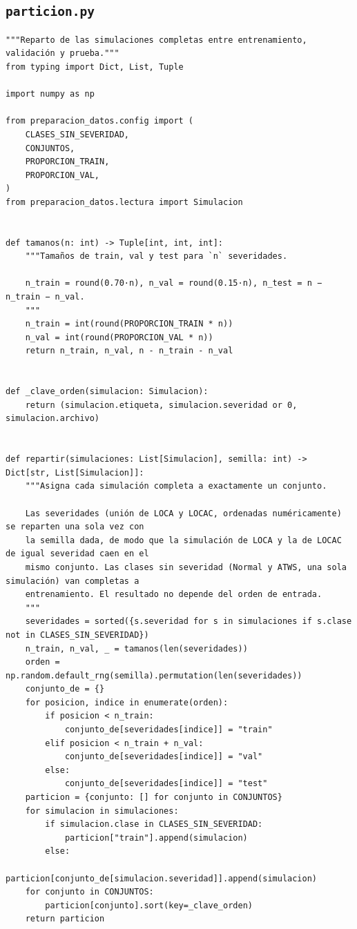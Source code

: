 \documentclass[12pt,a4paper]{article}
\begin{document}
\subsection*{\texttt{particion.py}}
\begin{lstlisting}
"""Reparto de las simulaciones completas entre entrenamiento, validación y prueba."""
from typing import Dict, List, Tuple

import numpy as np

from preparacion_datos.config import (
    CLASES_SIN_SEVERIDAD,
    CONJUNTOS,
    PROPORCION_TRAIN,
    PROPORCION_VAL,
)
from preparacion_datos.lectura import Simulacion


def tamanos(n: int) -> Tuple[int, int, int]:
    """Tamaños de train, val y test para `n` severidades.

    n_train = round(0.70·n), n_val = round(0.15·n), n_test = n − n_train − n_val.
    """
    n_train = int(round(PROPORCION_TRAIN * n))
    n_val = int(round(PROPORCION_VAL * n))
    return n_train, n_val, n - n_train - n_val


def _clave_orden(simulacion: Simulacion):
    return (simulacion.etiqueta, simulacion.severidad or 0, simulacion.archivo)


def repartir(simulaciones: List[Simulacion], semilla: int) -> Dict[str, List[Simulacion]]:
    """Asigna cada simulación completa a exactamente un conjunto.

    Las severidades (unión de LOCA y LOCAC, ordenadas numéricamente) se reparten una sola vez con
    la semilla dada, de modo que la simulación de LOCA y la de LOCAC de igual severidad caen en el
    mismo conjunto. Las clases sin severidad (Normal y ATWS, una sola simulación) van completas a
    entrenamiento. El resultado no depende del orden de entrada.
    """
    severidades = sorted({s.severidad for s in simulaciones if s.clase not in CLASES_SIN_SEVERIDAD})
    n_train, n_val, _ = tamanos(len(severidades))
    orden = np.random.default_rng(semilla).permutation(len(severidades))
    conjunto_de = {}
    for posicion, indice in enumerate(orden):
        if posicion < n_train:
            conjunto_de[severidades[indice]] = "train"
        elif posicion < n_train + n_val:
            conjunto_de[severidades[indice]] = "val"
        else:
            conjunto_de[severidades[indice]] = "test"
    particion = {conjunto: [] for conjunto in CONJUNTOS}
    for simulacion in simulaciones:
        if simulacion.clase in CLASES_SIN_SEVERIDAD:
            particion["train"].append(simulacion)
        else:
            particion[conjunto_de[simulacion.severidad]].append(simulacion)
    for conjunto in CONJUNTOS:
        particion[conjunto].sort(key=_clave_orden)
    return particion
\end{lstlisting}
\end{document}
